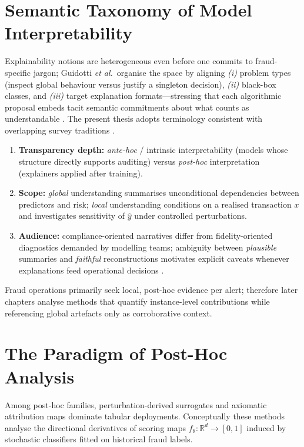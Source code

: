 \section{Semantic Taxonomy of Model Interpretability}
Explainability notions are heterogeneous even before one commits to fraud-specific jargon; Guidotti \emph{et al.}\ organise the space by aligning \emph{(i)} problem types (inspect global behaviour versus justify a singleton decision), \emph{(ii)} black-box classes, and \emph{(iii)} target explanation formats—stressing that each algorithmic proposal embeds tacit semantic commitments about what counts as understandable \cite{guidotti_blackbox_survey2018}. The present thesis adopts terminology consistent with overlapping survey traditions \cite{xai_survey,molnarInterpretableMachineLearningBook}.
\begin{enumerate}
    \item \textbf{Transparency depth:} \emph{ante-hoc} / intrinsic interpretability (models whose structure directly supports auditing) versus \emph{post-hoc} interpretation (explainers applied after training).
    \item \textbf{Scope:} \emph{global} understanding summarises unconditional dependencies between predictors and risk; \emph{local} understanding conditions on a realised transaction $x$ and investigates sensitivity of $\hat{y}$ under controlled perturbations.
    \item \textbf{Audience:} compliance-oriented narratives differ from fidelity-oriented diagnostics demanded by modelling teams; ambiguity between \emph{plausible} summaries and \emph{faithful} reconstructions motivates explicit caveats whenever explanations feed operational decisions \cite{xai_survey}.
\end{enumerate}
Fraud operations primarily seek local, post-hoc evidence per alert; therefore later chapters analyse methods that quantify instance-level contributions while referencing global artefacts only as corroborative context.

\section{The Paradigm of Post-Hoc Analysis}
Among post-hoc families, perturbation-derived surrogates and axiomatic attribution maps dominate tabular deployments. Conceptually these methods analyse the directional derivatives of scoring maps $f_\theta:\mathbb{R}^d\to[0,1]$ induced by stochastic classifiers fitted on historical fraud labels.


